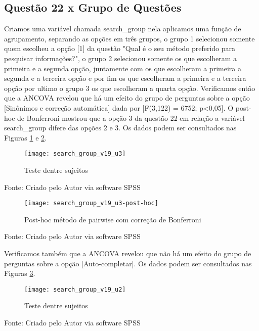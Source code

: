 \subsection{Questão 22 x Grupo de Questões}

Criamos uma variável chamada search\_group nela aplicamos uma função de agrupamento, separando as opções em três grupos, o grupo 1 selecionou somente quem escolheu a opção [1] da questão  "Qual é o seu método preferido para pesquisar informações?", o grupo 2 selecionou somente os que escolheram a primeira e a segunda opção, juntamente com os que escolheram a primeira a segunda e a terceira opção e por  fim os que escolheram a primeira e a terceira opção por ultimo o grupo 3 os que escolheram a quarta opção.\newline
\indent Verificamos então que a ANCOVA revelou que há um efeito do grupo de perguntas sobre a opção [Sinônimos e correção automática] dada por [F(3,122) = 6752; p<0,05]. O post-hoc de Bonferroni mostrou que a opção 3 da questão 22 em relação a variável search\_group difere das opções 2 e 3.\newline
\indent Os dados podem ser consultados nas Figuras \ref{fig:figura-search_group_v19_u3} e \ref{fig:figura-search_group_v19_u3-post-hoc}.

\begin{figure}[H]
	\centering	
	\caption{Teste dentre sujeitos}
	\texttt{[image: search\_group\_v19\_u3]}
	\label{fig:figura-search_group_v19_u3}
\end{figure}
\vspace{-0.8 cm} \hspace{1.55 cm} Fonte: Criado pelo Autor via software SPSS

\begin{figure}[H]
	\centering	
	\caption{Post-hoc método de pairwise com correção de Bonferroni}
	\texttt{[image: search\_group\_v19\_u3-post-hoc]}
	\label{fig:figura-search_group_v19_u3-post-hoc}
\end{figure}
\vspace{-0.8 cm} \hspace{1.55 cm} Fonte: Criado pelo Autor via software SPSS

Verificamos também que a ANCOVA revelou que não há um efeito do grupo de perguntas sobre a opção [Auto-completar].\newline
\indent Os dados podem ser consultados nas Figuras \ref{fig:figura-search_group_v19_u2}.

\begin{figure}[H]
	\centering	
	\caption{Teste dentre sujeitos}
	\texttt{[image: search\_group\_v19\_u2]}
	\label{fig:figura-search_group_v19_u2}
\end{figure}
\vspace{-0.8 cm} \hspace{1.55 cm} Fonte: Criado pelo Autor via software SPSS

